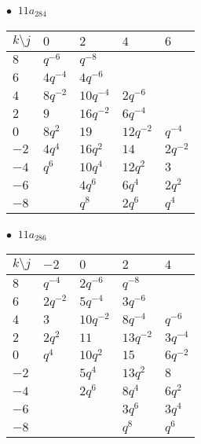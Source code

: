 \begin{minipage}{\linewidth}
$\bullet\ $ $11a_{284}$ \vspace{0.5em} \\
\begin{tabular}{l|llll}
$k \setminus j$ & $0$ & $2$ & $4$ & $6$ \\
\hline
$8$ & $q^{-6}$ & $q^{-8}$ &  &  \\
$6$ & $4q^{-4}$ & $4q^{-6}$ &  &  \\
$4$ & $8q^{-2}$ & $10q^{-4}$ & $2q^{-6}$ &  \\
$2$ & $9$ & $16q^{-2}$ & $6q^{-4}$ &  \\
$0$ & $8q^{2}$ & $19$ & $12q^{-2}$ & $q^{-4}$ \\
$-2$ & $4q^{4}$ & $16q^{2}$ & $14$ & $2q^{-2}$ \\
$-4$ & $q^{6}$ & $10q^{4}$ & $12q^{2}$ & $3$ \\
$-6$ &  & $4q^{6}$ & $6q^{4}$ & $2q^{2}$ \\
$-8$ &  & $q^{8}$ & $2q^{6}$ & $q^{4}$ \\
\end{tabular}
\vspace{2em}
\end{minipage}
%
\begin{minipage}{\linewidth}
$\bullet\ $ $11a_{286}$ \vspace{0.5em} \\
\begin{tabular}{l|llll}
$k \setminus j$ & $-2$ & $0$ & $2$ & $4$ \\
\hline
$8$ & $q^{-4}$ & $2q^{-6}$ & $q^{-8}$ &  \\
$6$ & $2q^{-2}$ & $5q^{-4}$ & $3q^{-6}$ &  \\
$4$ & $3$ & $10q^{-2}$ & $8q^{-4}$ & $q^{-6}$ \\
$2$ & $2q^{2}$ & $11$ & $13q^{-2}$ & $3q^{-4}$ \\
$0$ & $q^{4}$ & $10q^{2}$ & $15$ & $6q^{-2}$ \\
$-2$ &  & $5q^{4}$ & $13q^{2}$ & $8$ \\
$-4$ &  & $2q^{6}$ & $8q^{4}$ & $6q^{2}$ \\
$-6$ &  &  & $3q^{6}$ & $3q^{4}$ \\
$-8$ &  &  & $q^{8}$ & $q^{6}$ \\
\end{tabular}
\vspace{2em}
\end{minipage}
%
